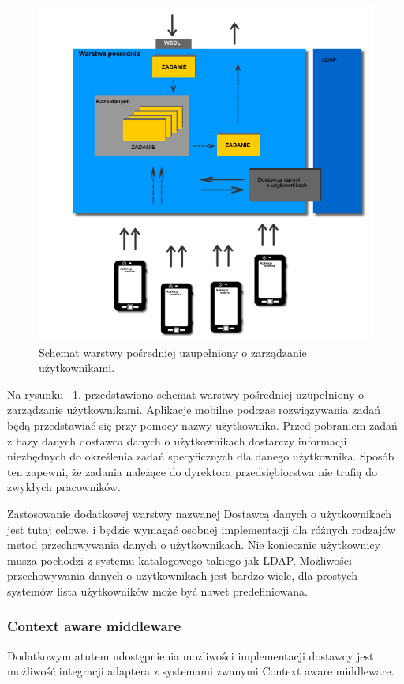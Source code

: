 \begin{figure}[h]
\centerline{\includegraphics[scale=0.5]{middlewareUserDataProviderConceptDiagram}}
\caption{Schemat warstwy pośredniej uzupełniony o zarządzanie użytkownikami.}
\label{fig:middlewareUserDataProviderConceptDiagram}
\end{figure}

Na rysunku ~\ref{fig:middlewareUserDataProviderConceptDiagram}. przedstawiono schemat warstwy pośredniej uzupełniony o zarządzanie użytkownikami. Aplikacje mobilne podczas rozwiązywania zadań będą przedstawiać się przy pomocy nazwy użytkownika. Przed pobraniem zadań z bazy danych dostawca danych o użytkownikach dostarczy informacji niezbędnych do określenia zadań specyficznych dla danego użytkownika. Sposób ten zapewni, że zadania należące do dyrektora przedsiębiorstwa nie trafią do zwykłych pracowników. 

Zastosowanie dodatkowej warstwy nazwanej Dostawcą danych o użytkownikach jest tutaj celowe, i będzie wymagać osobnej implementacji dla różnych rodzajów metod przechowywania danych o użytkownikach. Nie koniecznie użytkownicy musza pochodzi z systemu katalogowego takiego jak LDAP. Możliwości przechowywania danych o użytkownikach jest bardzo wiele, dla prostych systemów lista użytkowników może być nawet predefiniowana.

\subsubsection{Context aware middleware}
Dodatkowym atutem udostępnienia możliwości implementacji dostawcy jest możliwość integracji adaptera z systemami zwanymi Context aware middleware. 

